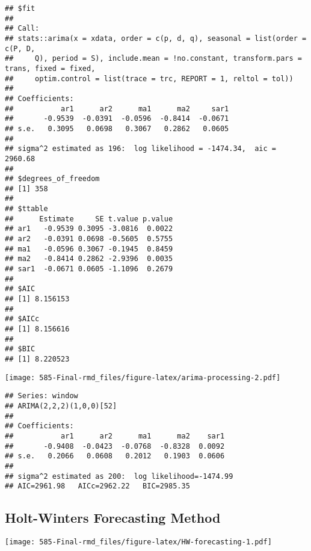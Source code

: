 \documentclass[
]{article}
\begin{document}
\begin{verbatim}
## $fit
## 
## Call:
## stats::arima(x = xdata, order = c(p, d, q), seasonal = list(order = c(P, D, 
##     Q), period = S), include.mean = !no.constant, transform.pars = trans, fixed = fixed, 
##     optim.control = list(trace = trc, REPORT = 1, reltol = tol))
## 
## Coefficients:
##           ar1      ar2      ma1      ma2     sar1
##       -0.9539  -0.0391  -0.0596  -0.8414  -0.0671
## s.e.   0.3095   0.0698   0.3067   0.2862   0.0605
## 
## sigma^2 estimated as 196:  log likelihood = -1474.34,  aic = 2960.68
## 
## $degrees_of_freedom
## [1] 358
## 
## $ttable
##      Estimate     SE t.value p.value
## ar1   -0.9539 0.3095 -3.0816  0.0022
## ar2   -0.0391 0.0698 -0.5605  0.5755
## ma1   -0.0596 0.3067 -0.1945  0.8459
## ma2   -0.8414 0.2862 -2.9396  0.0035
## sar1  -0.0671 0.0605 -1.1096  0.2679
## 
## $AIC
## [1] 8.156153
## 
## $AICc
## [1] 8.156616
## 
## $BIC
## [1] 8.220523
\end{verbatim}

\texttt{[image: 585-Final-rmd\_files/figure-latex/arima-processing-2.pdf]}

\begin{verbatim}
## Series: window 
## ARIMA(2,2,2)(1,0,0)[52] 
## 
## Coefficients:
##           ar1      ar2      ma1      ma2    sar1
##       -0.9408  -0.0423  -0.0768  -0.8328  0.0092
## s.e.   0.2066   0.0608   0.2012   0.1903  0.0606
## 
## sigma^2 estimated as 200:  log likelihood=-1474.99
## AIC=2961.98   AICc=2962.22   BIC=2985.35
\end{verbatim}

\hypertarget{holt-winters-forecasting-method}{%
\subsection{Holt-Winters Forecasting
Method}\label{holt-winters-forecasting-method}}

\texttt{[image: 585-Final-rmd\_files/figure-latex/HW-forecasting-1.pdf]}
\end{document}
